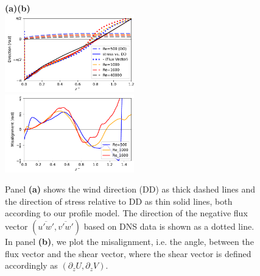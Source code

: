 \documentclass[smallcondensed,final]{svjour3}
\newcommand{\p}{\partial}
\begin{document}
\begin{figure}
  \textbf{(a)\hspace{0.48\textwidth}(b)}\\[-0.15em]
  \includegraphics[width=0.5\textwidth]{../plot/stress_rotation.pdf}
  \includegraphics[width=0.5\textwidth]{../plot/misalignment.pdf} 
  \caption{Panel \textbf{(a)} shows the wind direction (DD) as thick dashed lines and the direction of stress relative to DD as thin solid lines, both according to our profile model. The direction of the negative flux vector $(\overline{u'w'},\overline{v'w'})$ based on DNS data is shown as a dotted line. In panel \textbf{(b)}, we plot the misalignment, i.e. the angle, between the flux vector and the shear vector, where the shear vector is defined accordingly as $(\p_z U, \p_z V)$.} 
  \label{fig:alignment}
\end{figure}


%
\par%
%

%
%
\end{document}
